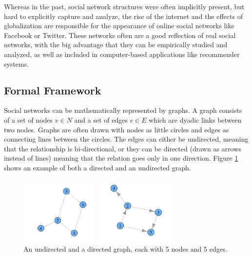 Whereas in the past, social network structures were often implicitly present, but hard to explicitly capture and analyze, the rise of the internet and the effects of globalization are responsible for the appearance of online social networks like Facebook or Twitter. These networks often are a good reflection of real social networks, with the big advantage that they can be empirically studied and analyzed, as well as included in computer-based applications like recommender systems.

\subsection{Formal Framework}
\label{sst:formalframeworkgraphs} Social networks can be mathematically represented by graphs. A graph consists of a set of nodes $v \in N$ and a set of edges $e \in E$ which are dyadic links between two nodes. Graphs are often drawn with nodes as little circles and edges as connecting lines between the circles. The edges can either be undirected, meaning that the relationship is bi-directional, or they can be directed (drawn as arrows instead of lines) meaning that the relation goes only in one direction. Figure \ref{f:simplegraph} shows an example of both a directed and an undirected graph.

\begin{figure}[!ht]
\centering
\begin{minipage}[b]{5 cm}
\includegraphics[width=150px]{./2-recommendersystemssocialnetworks/figures/SampleGraph.png}
\end{minipage}
\begin{minipage}[b]{5 cm}
\includegraphics[width=150px]{./2-recommendersystemssocialnetworks/figures/SampleGraph2.png}
\end{minipage}
\caption[An undirected and a directed graph, each with 5 nodes and 5 edges.]
{An undirected and a directed graph, each with 5 nodes and 5 edges.}
\label{f:simplegraph}
\end{figure}

